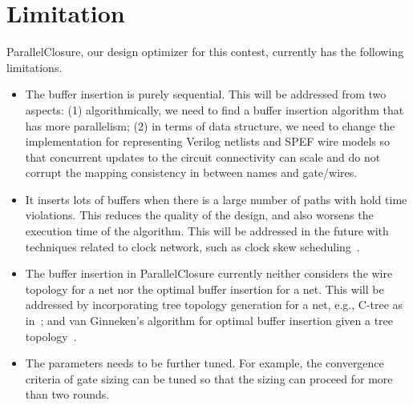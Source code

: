 \section{Limitation}
\label{sec:limit}

ParallelClosure, our design optimizer for this contest, currently has the following limitations.

\begin{itemize}
\item The buffer insertion is purely sequential. This will be addressed from two aspects: (1) algorithmically, we need to find a buffer insertion algorithm that has more parallelism; (2) in terms of data structure, we need to change the implementation for representing Verilog netlists and SPEF wire models so that concurrent updates to the circuit connectivity can scale and do not corrupt the mapping consistency in between names and gate/wires.
\item It inserts lots of buffers when there is a large number of paths with hold time violations. This reduces the quality of the design, and also worsens the execution time of the algorithm. This will be addressed in the future with techniques related to clock network, such as clock skew scheduling~\cite{Friedman:Clock}.
\item The buffer insertion in ParallelClosure currently neither considers the wire topology for a net nor the optimal buffer insertion for a net. This will be addressed by incorporating tree topology generation for a net, e.g., C-tree as in~\cite{Alpert:Buffered}; and van Ginneken's algorithm for optimal buffer insertion given a tree topology~\cite{Lukas:Buffer}. 
\item The parameters needs to be further tuned. For example, the convergence criteria of gate sizing can be tuned so that the sizing can proceed for more than two rounds.
\end{itemize}
